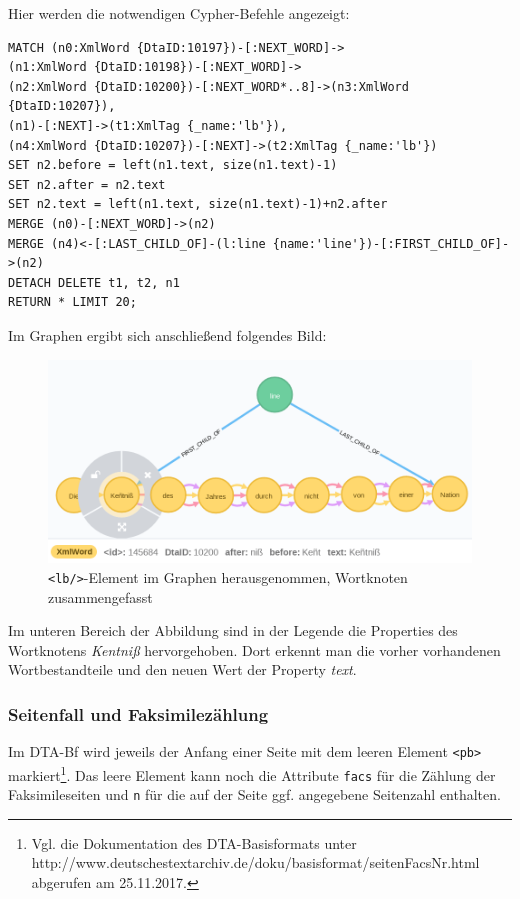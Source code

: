 Hier werden die notwendigen Cypher-Befehle angezeigt:

\begin{verbatim}
MATCH (n0:XmlWord {DtaID:10197})-[:NEXT_WORD]->
(n1:XmlWord {DtaID:10198})-[:NEXT_WORD]->
(n2:XmlWord {DtaID:10200})-[:NEXT_WORD*..8]->(n3:XmlWord {DtaID:10207}),
(n1)-[:NEXT]->(t1:XmlTag {_name:'lb'}),
(n4:XmlWord {DtaID:10207})-[:NEXT]->(t2:XmlTag {_name:'lb'})
SET n2.before = left(n1.text, size(n1.text)-1)
SET n2.after = n2.text
SET n2.text = left(n1.text, size(n1.text)-1)+n2.after
MERGE (n0)-[:NEXT_WORD]->(n2)
MERGE (n4)<-[:LAST_CHILD_OF]-(l:line {name:'line'})-[:FIRST_CHILD_OF]->(n2)
DETACH DELETE t1, t2, n1
RETURN * LIMIT 20;
\end{verbatim}

Im Graphen ergibt sich anschließend folgendes Bild:

\begin{figure}
\centering
\includegraphics{Bilder/TEI2Graph/lb-Trennung-rausgenommen2.png}
\caption{\texttt{\textless{}lb/\textgreater{}}-Element im Graphen
herausgenommen, Wortknoten zusammengefasst}
\end{figure}

Im unteren Bereich der Abbildung sind in der Legende die Properties des
Wortknotens \emph{Kentniß} hervorgehoben. Dort erkennt man die vorher
vorhandenen Wortbestandteile und den neuen Wert der Property
\emph{text}.

\hypertarget{seitenfall-und-faksimilezuxe4hlung}{%
\subsubsection{Seitenfall und
Faksimilezählung}\label{seitenfall-und-faksimilezuxe4hlung}}

Im DTA-Bf wird jeweils der Anfang einer Seite mit dem leeren Element
\texttt{\textless{}pb\textgreater{}} markiert\footnote{Vgl. die
  Dokumentation des DTA-Basisformats unter
  http://www.deutschestextarchiv.de/doku/basisformat/seitenFacsNr.html
  abgerufen am 25.11.2017.}. Das leere Element kann noch die Attribute
\texttt{facs} für die Zählung der Faksimileseiten und \texttt{n} für die
auf der Seite ggf. angegebene Seitenzahl enthalten.

